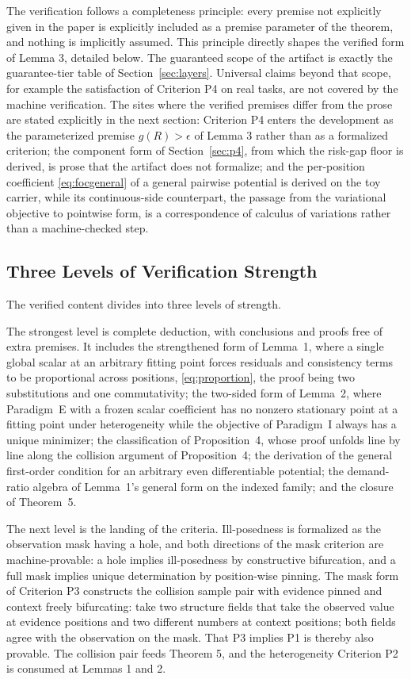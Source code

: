 The verification follows a completeness principle: every premise not explicitly given in the paper is explicitly included as a premise parameter of the theorem, and nothing is implicitly assumed. This principle directly shapes the verified form of Lemma 3, detailed below. The guaranteed scope of the artifact is exactly the guarantee-tier table of Section~\ref{sec:layers}. Universal claims beyond that scope, for example the satisfaction of Criterion P4 on real tasks, are not covered by the machine verification. The sites where the verified premises differ from the prose are stated explicitly in the next section: Criterion P4 enters the development as the parameterized premise $g(R) > \epsilon$ of Lemma 3 rather than as a formalized criterion; the component form of Section~\ref{sec:p4}, from which the risk-gap floor is derived, is prose that the artifact does not formalize; and the per-position coefficient \eqref{eq:focgeneral} of a general pairwise potential is derived on the toy carrier, while its continuous-side counterpart, the passage from the variational objective to pointwise form, is a correspondence of calculus of variations rather than a machine-checked step.

\subsection{Three Levels of Verification Strength}

The verified content divides into three levels of strength.

The strongest level is complete deduction, with conclusions and proofs free of extra premises. It includes the strengthened form of Lemma~1, where a single global scalar at an arbitrary fitting point forces residuals and consistency terms to be proportional across positions, \eqref{eq:proportion}, the proof being two substitutions and one commutativity; the two-sided form of Lemma~2, where Paradigm~E with a frozen scalar coefficient has no nonzero stationary point at a fitting point under heterogeneity while the objective of Paradigm~I always has a unique minimizer; the classification of Proposition~4, whose proof unfolds line by line along the collision argument of Proposition~4; the derivation of the general first-order condition for an arbitrary even differentiable potential; the demand-ratio algebra of Lemma~1's general form on the indexed family; and the closure of Theorem~5.

The next level is the landing of the criteria. Ill-posedness is formalized as the observation mask having a hole, and both directions of the mask criterion are machine-provable: a hole implies ill-posedness by constructive bifurcation, and a full mask implies unique determination by position-wise pinning. The mask form of Criterion P3 constructs the collision sample pair with evidence pinned and context freely bifurcating: take two structure fields that take the observed value at evidence positions and two different numbers at context positions; both fields agree with the observation on the mask. That P3 implies P1 is thereby also provable. The collision pair feeds Theorem 5, and the heterogeneity Criterion P2 is consumed at Lemmas 1 and 2.

